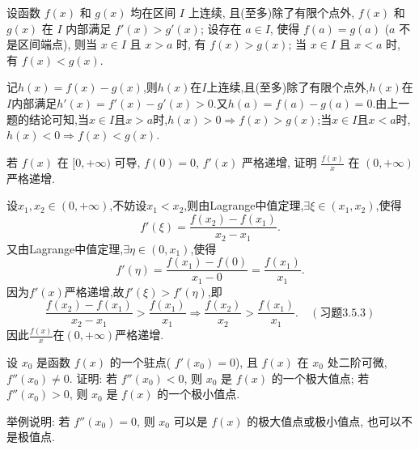 \begin{exercise}[3.3.17]\label{ex:3.3.17}
    设函数 $f(x)$ 和 $g(x)$ 均在区间 $I$ 上连续, 且(至多)除了有限个点外, $f(x)$ 和 $g(x)$ 在 $I$ 内部满足 $f'(x) > g'(x)$; 设存在 $a \in I$, 使得 $f(a)=g(a)$ ($a$ 不是区间端点), 则当 $x \in I$ 且 $x>a$ 时, 有 $f(x)>g(x)$; 当 $x \in I$ 且 $x<a$ 时, 有 $f(x)<g(x)$.
\end{exercise}

\begin{solution}
    记$h(x) = f(x) - g(x)$,则$h(x)$在$I$上连续,且(至多)除了有限个点外,$h(x)$在$I$内部满足$h'(x) = f'(x) - g'(x) > 0$.又$h(a) = f(a) - g(a) = 0$.由上一题的结论可知,当$x \in I$且$x > a$时,$h(x) > 0 \Rightarrow f(x) > g(x)$;当$x \in I$且$x < a$时,$h(x) < 0 \Rightarrow f(x) < g(x)$.
\end{solution}

\begin{exercise}[3.3.18]
    若 $f(x)$ 在 $[0, +\infty)$ 可导, $f(0)=0$, $f'(x)$ 严格递增, 证明 $\frac{f(x)}{x}$ 在 $(0, +\infty)$ 严格递增.
\end{exercise}

\begin{solution}
    设$x_1,x_2 \in (0,+\infty)$,不妨设$x_1 < x_2$,则由Lagrange中值定理,$\exists \xi \in (x_1,x_2)$,使得
    $$
        f'(\xi) = \frac{f(x_2)-f(x_1)}{x_2 - x_1}.
    $$
    又由Lagrange中值定理,$\exists \eta \in (0,x_1)$,使得
    $$
        f'(\eta) = \frac{f(x_1)-f(0)}{x_1 - 0} = \frac{f(x_1)}{x_1}.
    $$
    因为$f'(x)$严格递增,故$f'(\xi) > f'(\eta)$,即
    $$
        \frac{f(x_2)-f(x_1)}{x_2 - x_1} > \frac{f(x_1)}{x_1} \Rightarrow \frac{f(x_2)}{x_2} > \frac{f(x_1)}{x_1}. \quad (\hyperref[3.5.3]{\text{习题3.5.3}})
    $$
    因此$\frac{f(x)}{x}$在$(0,+\infty)$严格递增.
\end{solution}

\begin{exercise}[3.3.19]
    设 $x_0$ 是函数 $f(x)$ 的一个驻点( $f'(x_0)=0$), 且 $f(x)$ 在 $x_0$ 处二阶可微, $f''(x_0) \ne 0$. 证明: 若 $f''(x_0)<0$, 则 $x_0$ 是 $f(x)$ 的一个极大值点; 若 $f''(x_0)>0$, 则 $x_0$ 是 $f(x)$ 的一个极小值点. 

    举例说明: 若 $f''(x_0)=0$, 则 $x_0$ 可以是 $f(x)$ 的极大值点或极小值点, 也可以不是极值点.
\end{exercise}

